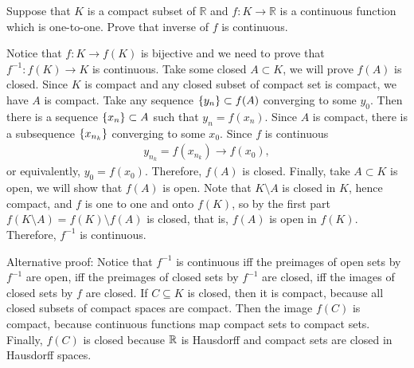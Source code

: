\begin{problem}
Suppose that $K$ is a compact subset of $\mathbb{R}$ and $f:K\rightarrow\mathbb{R}$ is a continuous function which is one-to-one. Prove that inverse of $f$ is continuous.
\begin{solution}
Notice that $f:K\rightarrow f(K)$ is bijective and we need to prove that $f^{-1}:f(K)\rightarrow K$ is continuous. Take some closed $A\subset K$, we will prove $f(A)$ is closed. Since $K$ is compact and any closed subset of compact set is compact, we have $A$ is compact. Take any sequence $\left\{ y_n\right\}\subset f(A)$ converging to some $y_0.$ Then there is a sequence $\left\{ x_n\right\}\subset A$ such that $y_n=f(x_n)$. Since $A$ is compact, there is a subsequence $\left\{ x_{n_k}\right\}$ converging to some $x_0.$ Since $f$ is continuous
\begin{align*}
    y_{n_k}=f(x_{n_k}) \rightarrow f(x_0),
\end{align*}
or equivalently, $y_0=f(x_0)$. Therefore, $f(A)$ is closed. Finally, take $A\subset K$ is open, we will show that $f(A)$ is open. Note that $K\setminus A$ is closed in $K$, hence compact, and $f$ is one to one and onto $f(K)$, so by the first part $f(K\setminus A)=f(K)\setminus f(A)$ is closed, that is, $f(A)$ is open in $f(K)$. Therefore, $f^{-1}$ is continuous.

Alternative proof: Notice that $f^{-1}$ is continuous iff the preimages of open sets by $f^{-1}$ are open, iff the preimages of closed sets by $f^{-1}$ are closed, iff the images of closed sets by $f$ are closed. If $C \subseteq K$ is closed, then it is compact, because all closed subsets of compact spaces are compact. Then the image $f(C)$ is compact, because continuous functions map compact sets to compact sets. Finally, $f(C)$ is closed because $\mathbb{R}$ is Hausdorff and compact sets are closed in Hausdorff spaces.
\end{solution}
\end{problem}


